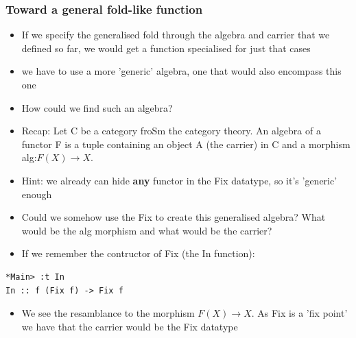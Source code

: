 \documentclass[10pt]{beamer}
\begin{document}
\begin{frame}[fragile]
\frametitle{Toward a general fold-like function}
\begin{itemize}
\item If we specify the generalised fold through the algebra and carrier that we defined so far, we would get a function specialised for just that cases
\item we have to use a more 'generic' algebra, one that would also encompass this one	
\item How could we find such an algebra?
\item Recap: Let C be a category froSm the category theory. An algebra of a functor F is a tuple containing an object A (the carrier) in C and a morphism alg:$F(X) \rightarrow X$. 
\item Hint: we already can hide \textbf{any} functor in the Fix datatype, so it's 'generic' enough
\item Could we somehow use the Fix to create this generalised algebra? What would be the alg morphism and what would be the carrier?
\item If we remember the contructor of Fix (the In function):	
\end{itemize}


\begin{lstlisting}
*Main> :t In
In :: f (Fix f) -> Fix f
\end{lstlisting}


\begin{itemize}
\item We see the resamblance to the morphism $F(X) \rightarrow X$. As Fix is a 'fix point' we have that the carrier would be the Fix datatype
\end{itemize}

\end{frame}
\end{document}
